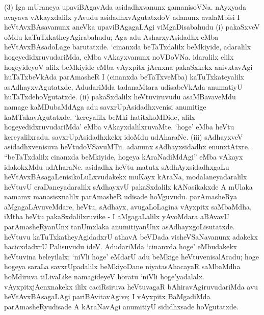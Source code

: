 (3) Iga mUraneya upaviBAgavAda asidadhxvanunx gamanisoVNa. nAyxyada avayava vAkayxdalilx yAvudu asidadhxvAgutatxdoV adanunx avalaMbisi I heVtAvxBAsavanunx aneVka upaviBAgagaLAgi viMgaDisabahudu {\rm(i)} pakaSxveV oMdu kaTuTxkathe\-yAgira\-bahudu; Aga adu AsharxyAsidadhx eMba heVtAvxBAsadoLage barutatxde. `cinanxda beTaTx\-dalilx beMkiyide, adaralilx hogeyedidxruvudariMda, eMba vAkayxvanunx noVDoVNa. idaralilx elilx hogeyideyoV alilx beMkiyide eMba vAyxpitx jAcnxna pakaSxkekx anivxtavAgi huTaTxbeVkAda parAmasheR I (cinanxda beTaTxveMba) kaTuTxkateyalilx asAdhayxvAgutatxde, AdudariMda tadanaMtara udisabeVkAda anumatiyU huTaTxdehoVgutatxde. {\rm(ii)} pakaSx\-dalilx heVtuviruvudu asaMBavaveMdu namage kaMDubaMdAga adu savxrUpA\-sidadhxvenisi anu\-mitige kaMTakavAgutatxde. `kereyalilx beMki hatitxkoMDide, alilx hogeyedidxruvudariMda' eMba vAkayxdalilxruvaMte. `hoge' eMba heVtu kereyalilxradu. savxrUpA\-sidadhxkekx idoMdu udAharaNe. {\rm(iii)} sAdhayxveV asidadhxvenisuva heVtudoVSavuMTu. adanunx sAdhayx\-sidadhx enunxtAtxre. ``beTaTxdalilx cinanxda beMkiyide, hogeya kAraNadiMdAgi'' eMba vAkayx ida\-kokxMdu udAharaNe. asidadhx heVtu matutx sAdhAyxsidadhxgaLu heVtAvx\-BAsagaLenisikoLuLx\-vudakekx muKayx kAraNa, modalaneyadaralilx heVtuvU eraDaneyadaralilx sAdhayxvU pakaSx\-dalilx kANasikakxde A mUlaka namamx manasisxnalilx parAmasheR udisade hoVguvudu. parAmasheRya aMgagaLAvuveMdare, heVtu, sAdhayx, avugaLoLagina vAyxpitx saMbaMdha, iMtha heVtu pakaSxdalilxruvike - I aMgagaLalilx yAvoMdara aBAvavU parAmasheR\-yanUnx tanUmxlaka anumitiyanUnx asAdhayxgoLisutatxde. heVtuvu kaTuTxkatheyAgi\-dadxrU athavA beVDada visheVSaNavanunx adakekx hacicxdadxrU Palisuvudu ideV. AdudariMda `cinanxda hoge' eMbudakekx heVtuvina beleyilalx; `niVli hoge' eMdarU adu beMkige heVtuvenisalAradu; hoge hogeya saraLa savxrUpadalilx beMkiyoDane niyata\-sAhacayaR saMbaMdha hoMdiruva tiLivaLike namagideyeV horatu `niVli hoge'yadalalx. vAyxpitxjAcnxnakekx ililx caciRsiruva heVtuvagaR bAhiravAgiruvudariMda avu heVtAvxBAsagaLAgi pariBAvitavAgive; I vAyxpitx BaMgadiMda parAmasheRyudisade A kAraNavAgi anumitiyU sididhxsade hoVgutatxde.

